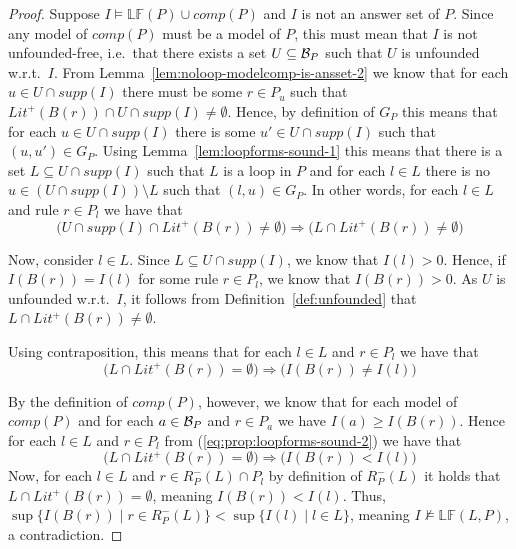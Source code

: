 \documentclass{tlp}
\newcommand{\hbase}[1]{{\ensuremath{{\cal B}_{#1}}}}
\newcommand{\body}[1]{\ensuremath{B(#1)}}
\newcommand{\comp}[1]{\ensuremath{comp(#1)}}
\newcommand{\poslit}[1]{\ensuremath{Lit^{+}(#1)}}
\newcommand{\posbody}[1]{\ensuremath{\poslit{\body{#1}}}}
\newcommand{\nonlooprules}[2]{R^{-}_{#1}(#2)}
\newcommand{\loopform}[2]{\mathbb{LF}(#1,#2)}
\newcommand{\loopformprog}[1]{\mathbb{LF}(#1)}
\newcommand{\supp}[1]{\ensuremath{\mathit{supp}(#1)}}
\newcommand{\imp}{\Rightarrow}
\begin{document}
\begin{proof}
 Suppose $I \models \loopformprog{P} \cup \comp{P}$ and $I$ is not an answer set of $P$. Since any model of $\comp{P}$ must be a model of $P$, this must mean that $I$ is not unfounded-free, i.e.~that there exists a set $U \subseteq \hbase{P}$ such that $U$ is unfounded w.r.t.~$I$. From Lemma~\ref{lem:noloop-modelcomp-is-ansset-2} we know that for each $u \in U \cap \supp{I}$ there must be some $r \in P_u$ such that $\posbody{r} \cap U \cap \supp{I} \neq \emptyset$. Hence, by definition of $G_P$ this means that for each $u \in U \cap \supp{I}$ there is some $u' \in U \cap \supp{I}$ such that $(u,u') \in G_P$. Using Lemma~\ref{lem:loopforms-sound-1} this means that there is a set $L \subseteq U \cap \supp{I}$ such that $L$ is a loop in $P$ and for each $l \in L$ there is no $u \in (U \cap \supp{I})\setminus L$ such that $(l,u) \in G_P$. In other words, for each $l \in L$ and rule $r \in P_l$ we have that
  \begin{equation}\Big(U \cap \supp{I} \cap \posbody{r} \neq \emptyset\Big) \imp \Big(L \cap \posbody{r} \neq \emptyset\Big)\label{eq:prop:loopforms-sound-1}\end{equation}

Now, consider $l \in L$. Since $L \subseteq U \cap \supp{I}$, we know that $I(l) > 0$. Hence, if $I(\body{r}) = I(l)$ for some rule $r \in P_l$, we know that $I(\body{r}) > 0$. As $U$ is unfounded w.r.t.~$I$, it follows from Definition~\ref{def:unfounded} that $L \cap \posbody{r} \neq \emptyset$.

 Using contraposition, this means that for each $l \in L$ and $r \in P_l$ we have that
  \begin{equation}\Big(L \cap \posbody{r} = \emptyset\Big) \imp \Big(I(\body{r}) \neq I(l)\Big)\label{eq:prop:loopforms-sound-2}\end{equation}

 By the definition of $\comp{P}$, however, we know that for each model of $\comp{P}$ and for each $a \in \hbase{P}$ and $r \in P_a$ we have $I(a) \geq I(\body{r})$. Hence for each $l \in L$ and $r \in P_l$ from (\ref{eq:prop:loopforms-sound-2}) we have that
  \begin{equation}\Big(L \cap \posbody{r} = \emptyset\Big) \imp \Big(I(\body{r}) < I(l)\Big)\label{eq:prop:loopforms-sound-3}\end{equation}
 Now, for each $l \in L$ and $r \in \nonlooprules{P}{L} \cap P_l$ by definition of $\nonlooprules{P}{L}$ it holds that $L \cap \posbody{r} = \emptyset$, meaning $I(\body{r}) < I(l)$. Thus, $\sup \{ I(\body{r}) \mid r \in \nonlooprules{P}{L} \} < \sup \{ I(l) \mid l \in L \}$, meaning $I \not\models \loopform{L}{P}$, a contradiction.
\end{proof}
\end{document}
